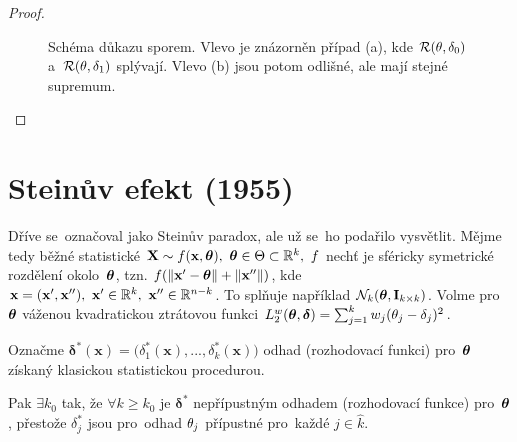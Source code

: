 \begin{theorem}["Obrátka"]
\begin{proof}
\begin{enumerate}[1)]
			\begin{figure}[h]
				\centering
				\caption{Schéma důkazu sporem. Vlevo je znázorněn případ (a), kde $ \mathcal{R}(\theta,\delta_0)$ a~$ \mathcal{R}(\theta,\delta_1)$ splývají. Vlevo (b) jsou potom odlišné, ale mají stejné supremum.}
				\label{fig:26-4}
			\end{figure}
		\end{enumerate}
	\end{proof}
\end{theorem}

\section{Steinův efekt (1955)}
Dříve se~označoval jako Steinův paradox, ale už se~ho podařilo vysvětlit.
Mějme tedy běžné statistické $\textbf{X}\sim f(\textbf{x},\boldsymbol{\theta}),~\boldsymbol{\theta}\in\Theta\subset\mathbb{R}^k,~f$ nechť je sféricky symetrické rozdělení okolo~$\boldsymbol{\theta}$, tzn. $f(\left\|\textbf{x}'-\boldsymbol{\theta}\right\|+\left\|\textbf{x}''\right\|)$, kde $\textbf{x}=(\textbf{x}',\textbf{x}''),~\textbf{x}'\in\mathbb{R}^k,~\textbf{x}''\in\mathbb{R}^{n-k}$. To splňuje například $\mathcal{N}_k(\boldsymbol{\theta},\textbf{I}_{k\times k})$. Volme pro~$\boldsymbol{\theta}$ váženou kvadratickou ztrátovou funkci $L_2^w(\boldsymbol{\theta},\boldsymbol{\delta})=\sum_{j=1}^k w_j(\theta_j-\delta_j)^2$. 

Označme $\boldsymbol{\delta}^\ast(\textbf{x})=\big(\delta_1^\ast(\textbf{x}),...,\delta_k^\ast(\textbf{x})\big)$ odhad (rozhodovací funkci) pro~$\boldsymbol{\theta}$ získaný klasickou statistickou procedurou. 

Pak $\exists k_0$ tak, že $\forall k\geq k_0$ je $\boldsymbol{\delta}^\ast$ nepřípustným odhadem (rozhodovací funkce) pro~$\boldsymbol{\theta}$, přestože $\delta_j^\ast$ jsou pro~odhad $\theta_j$ přípustné pro~každé $ j\in\widehat{k}$.

